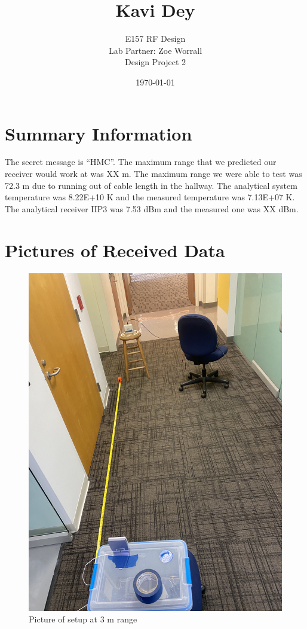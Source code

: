 \documentclass[letterpaper,12pt]{article}
\begin{document}
\title{\vspace{-2cm} Kavi Dey}
\author{\vspace{-0.4cm} E157 RF Design \\ Lab Partner: Zoe Worrall \\ Design Project 2}
\date{\vspace{-0.4cm} \today}
\maketitle



\section{Summary Information}
The secret message is ``HMC''. The maximum range that we predicted our receiver would work at was XX m.
The maximum range we were able to test was 72.3 m due to running out of cable length in the hallway.
The analytical system temperature was 8.22E+10 K and the measured temperature was 7.13E+07 K.
The analytical receiver IIP3 was 7.53 dBm and the measured one was XX dBm.

\newpage
\section{Pictures of Received Data}
\begin{figure}[H]
	\begin{centering}
		\includegraphics[width=0.5\columnwidth,angle=-90]{figures/3m.img}
		\caption{Picture of setup at 3 m range}
	\end{centering}
\end{figure}
\end{document}
